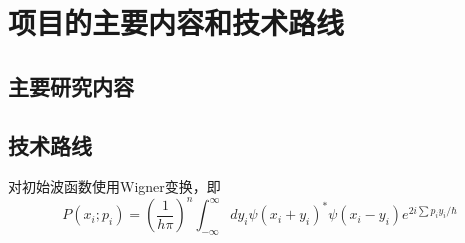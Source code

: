 \section{项目的主要内容和技术路线}

\subsection{主要研究内容}


\subsection{技术路线}
对初始波函数使用Wigner变换，即
\begin{equation}
	P\left(x_{i} ; p_{i}\right)=\left(\frac{1}{h \pi}\right)^{n} \int_{-\infty}^{\infty} d y_{i} \psi\left(x_{i}+y_{i}\right)^{*} \psi\left(x_{i}-y_{i}\right) e^{2 i \sum p_{i} y_{i} / \hbar}
\end{equation}

